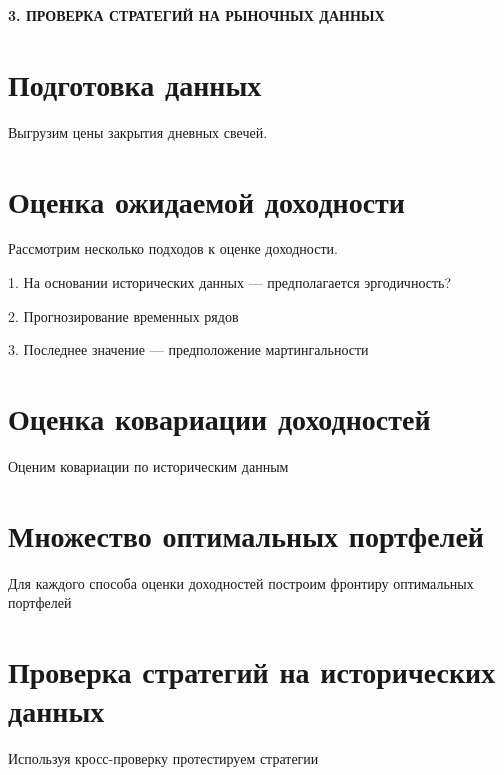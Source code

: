 \newpage
\begin{center}
	\textbf{\large 3. ПРОВЕРКА СТРАТЕГИЙ НА РЫНОЧНЫХ ДАННЫХ}
\end{center}

\section{Подготовка данных}

Выгрузим цены закрытия дневных свечей.

\section{Оценка ожидаемой доходности}

Рассмотрим несколько подходов к оценке доходности.

1. На основании исторических данных --- предполагается эргодичность?

2. Прогнозирование временных рядов

3. Последнее значение --- предположение мартингальности

\section{Оценка ковариации доходностей}

Оценим ковариации по историческим данным

\section{Множество оптимальных портфелей}

Для каждого способа оценки доходностей построим фронтиру оптимальных портфелей

\section{Проверка стратегий на исторических данных}

Используя кросс-проверку протестируем стратегии

